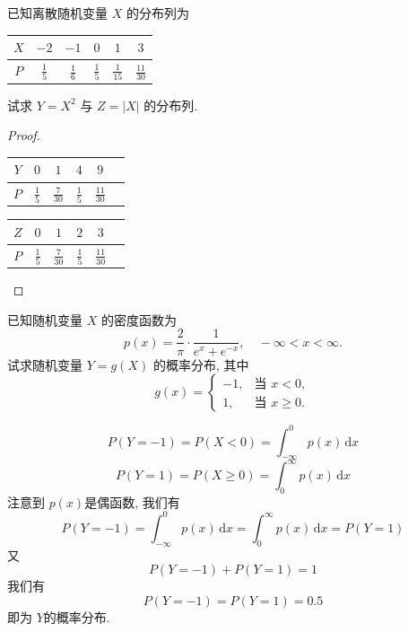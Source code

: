 \documentclass[../main.tex]{subfiles}
\begin{document}
\begin{exercise}{}{}
已知离散随机变量 $X$ 的分布列为
\begin{center}
\begin{tabular}{c|ccccc}
$X$ & $-2$ & $-1$ & $0$ & $1$ & $3$ \\
\hline
$P$ & $\frac{1}{5}$ & $\frac{1}{6}$ & $\frac{1}{5}$ & $\frac{1}{15}$ & $\frac{11}{30}$
\end{tabular}
\end{center}
试求 $Y = X^2$ 与 $Z = |X|$ 的分布列.
\end{exercise}
\begin{proof}


\begin{tabular}{c|ccccc}
$Y$ & $0$ & $1$ & $4$ & $9$ \\
\hline
$P$ & $\frac{1}{5}$ & $\frac{7}{30}$ & $\frac{1}{5}$ &\(  \frac{11 }{30 }   \) 
\end{tabular}

  
 
\begin{tabular}{c|ccccc}
$Z$ & $0$ & $1$ & $2$ & $3$ \\
\hline
$P$ & $\frac{1}{5}$ & $\frac{7}{30}$ & $\frac{1}{5}$ &\(  \frac{11 }{30 }   \) 
\end{tabular}

\end{proof}
\begin{exercise}{}{}
已知随机变量 $X$ 的密度函数为
$$p(x) = \dfrac{2}{\pi} \cdot \dfrac{1}{e^x + e^{-x}}, \quad -\infty < x < \infty.$$
试求随机变量 $Y = g(X)$ 的概率分布, 其中
$$g(x) = \begin{cases}
-1, & \text{当 } x < 0, \\
1, & \text{当 } x \geq 0.
\end{cases}$$
\end{exercise}
\begin{solution}
  \[
  P\left( Y= -1 \right)= P\left( X< 0 \right)= \int_{-\infty}^{0}p\left( x \right)\,\mathrm{d} x
  \] \[
  P\left( Y= 1 \right)= P\left( X\ge 0 \right)= \int_{0}^{\infty}p\left( x \right)\,\mathrm{d} x
  \]注意到 \(  p\left( x \right)   \)是偶函数, 我们有 \[
  P\left( Y= -1 \right)= \int_{-\infty}^{0}p\left( x \right)\,\mathrm{d} x= \int_{0}^{\infty}p\left( x \right)\,\mathrm{d} x= P\left( Y= 1 \right)    
  \]又 \[
  P\left( Y= -1 \right)+ P\left( Y= 1 \right)= 1  
  \]我们有 \[
  P\left( Y= -1 \right)= P\left( Y= 1 \right)= 0.5  
  \] 即为 \(  Y  \)的概率分布. 
\end{solution}
\end{document}

